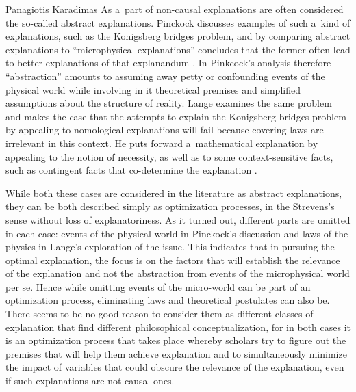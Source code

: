 \begin{artengenv}{Panagiotis Karadimas}
As a~part of non-causal explanations are often considered the so-called abstract explanations. Pinckock discusses examples of such a~kind of explanations, such as the Konigsberg bridges problem, and by comparing abstract explanations to ``microphysical explanations'' concludes that the former often lead to better explanations of that explanandum
\parencite[][]{pincock_role_2007}. In Pinkcock's analysis therefore ``abstraction'' amounts to assuming away petty or confounding events of the physical world while involving in it theoretical premises and simplified assumptions about the structure of reality. Lange examines the same problem and makes the case that the attempts to explain the Konigsberg bridges problem by appealing to nomological explanations will fail because covering laws are irrelevant in this context. He puts forward a~mathematical explanation by appealing to the notion of necessity, as well as to some context-sensitive facts, such as contingent facts that co-determine the explanation
\parencite[][]{lange_what_2013}.%


While both these cases are considered in the literature as abstract explanations, they can be both described simply as optimization processes, in the Strevens's sense without loss of explanatoriness. As it turned out, different parts are omitted in each case: events of the physical world in Pinckock's discussion and laws of the physics in Lange's exploration of the issue. This indicates that in pursuing the optimal explanation, the focus is on the factors that will establish the relevance of the explanation and not the abstraction from events of the microphysical world per se. Hence while omitting events of the micro-world can be part of an optimization process, eliminating laws and theoretical postulates can also be. There seems to be no good reason to consider them as different classes of explanation that find different philosophical conceptualization, for in both cases it is an optimization process that takes place whereby scholars try to figure out the premises that will help them achieve explanation and to simultaneously minimize the impact of variables that could obscure the relevance of the explanation, even if such explanations are not causal ones.


\end{artengenv}

